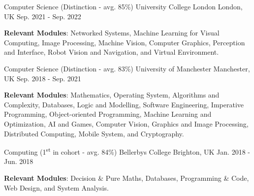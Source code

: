 

\begin{cventries}

  \eduentry
    {Computer Science (Distinction - avg. 85\%)} %
    {University College London} %
    {London, UK} %
    {Sep. 2021 - Sep. 2022} %
    {
      \begin{cvitems} %
        \item {\textbf{Relevant Modules}: Networked Systems, Machine Learning for Visual Computing, Image Processing, Machine Vision, Computer Graphics, Perception and Interface, Robot Vision and Navigation, and Virtual Environment.}
      \end{cvitems}
    }
    
  \eduentry
    {Computer Science (Distinction - avg. 83\%)} %
    {University of Manchester} %
    {Manchester, UK} %
    {Sep. 2018 - Sep. 2021} %
    {
      \begin{cvitems} %
        \item {\textbf{Relevant Modules}: Mathematics, Operating System, Algorithms and Complexity, Databases, Logic and Modelling, Software Engineering, Imperative Programming, Object-oriented Programming, Machine Learning and Optimization, AI and Games,  Computer Vision, Graphics and Image Processing, Distributed Computing, Mobile System, and Cryptography.}
      \end{cvitems}
    }
    
  \eduentry
    {Computing (1\textsuperscript{st} in cohort - avg. 84\%)} %
    {Bellerbys College} %
    {Brighton, UK} %
    {Jan. 2018 - Jun. 2018} %
    {
     \begin{cvitems} %
        \item {\textbf{Relevant Modules}: Decision \& Pure Maths, Databases, Programming \& Code, Web Design, and System Analysis.}
      \end{cvitems}
    }
    

\end{cventries}
